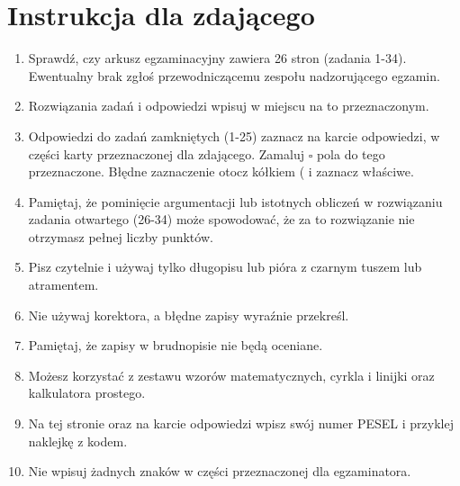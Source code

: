 \documentclass[10pt]{article}
\begin{document}
\section*{Instrukcja dla zdającego}
\begin{enumerate}
  \item Sprawdź, czy arkusz egzaminacyjny zawiera 26 stron (zadania 1-34). Ewentualny brak zgłoś przewodniczącemu zespołu nadzorującego egzamin.
  \item Rozwiązania zadań i odpowiedzi wpisuj w miejscu na to przeznaczonym.
  \item Odpowiedzi do zadań zamkniętych (1-25) zaznacz na karcie odpowiedzi, w części karty przeznaczonej dla zdającego. Zamaluj \(\square\) pola do tego przeznaczone. Błędne zaznaczenie otocz kółkiem ( i zaznacz właściwe.
  \item Pamiętaj, że pominięcie argumentacji lub istotnych obliczeń w rozwiązaniu zadania otwartego (26-34) może spowodować, że za to rozwiązanie nie otrzymasz pełnej liczby punktów.
  \item Pisz czytelnie i używaj tylko długopisu lub pióra z czarnym tuszem lub atramentem.
  \item Nie używaj korektora, a błędne zapisy wyraźnie przekreśl.
  \item Pamiętaj, że zapisy w brudnopisie nie będą oceniane.
  \item Możesz korzystać z zestawu wzorów matematycznych, cyrkla i linijki oraz kalkulatora prostego.
  \item Na tej stronie oraz na karcie odpowiedzi wpisz swój numer PESEL i przyklej naklejkę z kodem.
  \item Nie wpisuj żadnych znaków w części przeznaczonej dla egzaminatora.
\end{enumerate}
\end{document}

